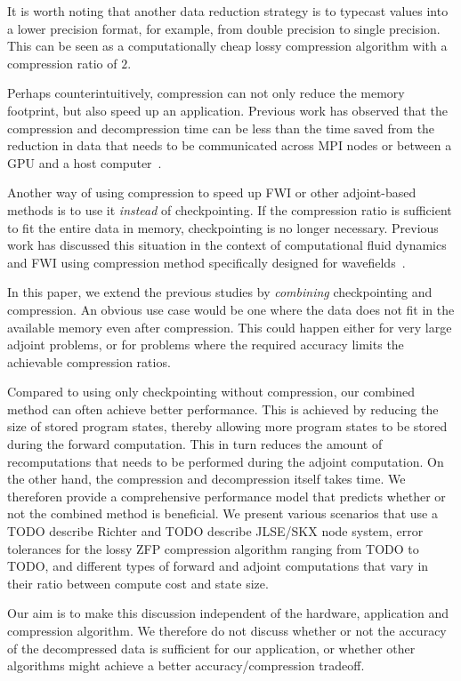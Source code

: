 \documentclass[conference]{IEEEtran}
\begin{document}
It is worth noting that another data reduction strategy is to typecast values
into a lower precision format, for example, from double precision to single
precision. This can be seen as a computationally cheap lossy compression
algorithm with a compression ratio of $2$.

Perhaps counterintuitively, compression can not only reduce the memory
footprint, but also speed up an application. Previous work has observed that the
compression and decompression time can be less than the time saved from the
reduction in data that needs to be communicated across MPI nodes or between a
GPU and a host computer~\cite{gpu-compression}.

Another way of using compression to speed up FWI or other adjoint-based methods
is to use it \emph{instead} of checkpointing. If the compression ratio is
sufficient to fit the entire data in memory, checkpointing is no longer
necessary. Previous work has discussed this situation in the context of
computational fluid dynamics~\cite{cyr2015towards} and FWI using compression
method specifically designed for
wavefields~\cite{dalmau2014lossy,boehm2016wavefield}.

In this paper, we extend the previous studies by \emph{combining} checkpointing
and compression. An obvious use case would be one where the data does not fit
in the available memory even after compression. This could happen either for
very large adjoint problems, or for problems where the required accuracy limits
the achievable compression ratios.

Compared to using only checkpointing without compression, our combined method
can often achieve better performance. This is achieved by reducing the size of
stored program states, thereby allowing more program states to be stored during
the forward computation. This in turn reduces the amount of recomputations that
needs to be performed during the adjoint computation. On the other hand, the
compression and decompression itself takes time.  We thereforen provide a
comprehensive performance model that predicts whether or not the combined method
is beneficial. We present various scenarios that use a TODO describe Richter and
TODO describe JLSE/SKX node system, error tolerances for the lossy ZFP
compression algorithm ranging from TODO to TODO, and different types of forward
and adjoint computations that vary in their ratio between compute cost and state
size. 

Our aim is to make this discussion independent of the hardware, application and
compression algorithm. We therefore do not discuss whether or not the accuracy
of the decompressed data is sufficient for our application, or whether
other algorithms might achieve a better accuracy/compression tradeoff.
\end{document}
